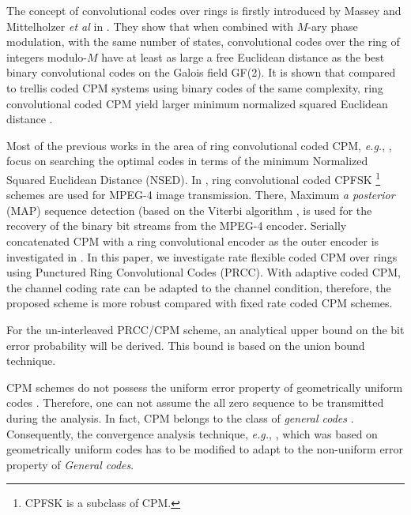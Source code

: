 \documentclass[12pt,twoside,onecolumn,a4paper,english]{IEEEtran2e}
\begin{document}
The concept of convolutional codes over rings is firstly
introduced by Massey and Mittelholzer \textit{et al} in
\cite{ringCC89}. %
They show that when combined with
$M$-ary phase modulation, with the same number of states,
convolutional codes over the ring of integers modulo-$M$ have at
least as large a free Euclidean distance \cite{anderson} as the best
binary convolutional codes on the Galois field GF(2).  It is shown
\cite{ringcodedCPMyang,ringcodedCPMrimoldi} that compared to
trellis coded CPM  systems using binary codes of the same
complexity, ring convolutional coded CPM yield larger minimum
normalized squared Euclidean distance \cite{anderson}.

Most of the previous works in the area of ring convolutional coded
CPM, \textit{e.g.},
\cite{ringcodedCPMyang,ringcodedCPMrimoldi,ringcodedCPMlee}, focus
on searching the optimal codes in terms of the minimum Normalized
Squared Euclidean Distance (NSED). In \cite{ringcodedCPMMPEG},
ring convolutional coded CPFSK \cite{anderson}\footnote{CPFSK is a
subclass of CPM.} schemes are used for MPEG-4 image transmission.
There, Maximum \textit{a posterior} (MAP) sequence detection
(based on the Viterbi algorithm \cite{viterbialg}, %
is used for the recovery of the binary
bit streams from the MPEG-4 encoder. %
Serially concatenated CPM with a ring convolutional encoder as the
outer encoder is investigated in \cite{SCRingCPM}. In this paper,
we investigate rate flexible coded CPM over rings using Punctured
Ring Convolutional Codes (PRCC).
With adaptive coded CPM, the channel coding rate can be adapted to
the channel condition, therefore, the proposed scheme is more
robust compared with fixed rate coded CPM schemes.

For the un-interleaved PRCC/CPM scheme, an analytical upper bound on the bit error probability will be derived. This bound is based on
the union bound technique.

%
CPM schemes do not possess the uniform error property
\cite{viterbi}
 of geometrically uniform codes \cite{uniformcodes}.
Therefore, one can not assume the all zero sequence to be
transmitted during the analysis. In fact, CPM belongs to the class
of \textit{general codes} \cite{generalcodes}. Consequently, the
convergence analysis technique, \textit{e.g.},
\cite{exit,bitvssymbolinterleaver}, which was based on
geometrically uniform codes has to be modified to adapt to the
non-uniform error property of \textit{General codes}.
\end{document}
